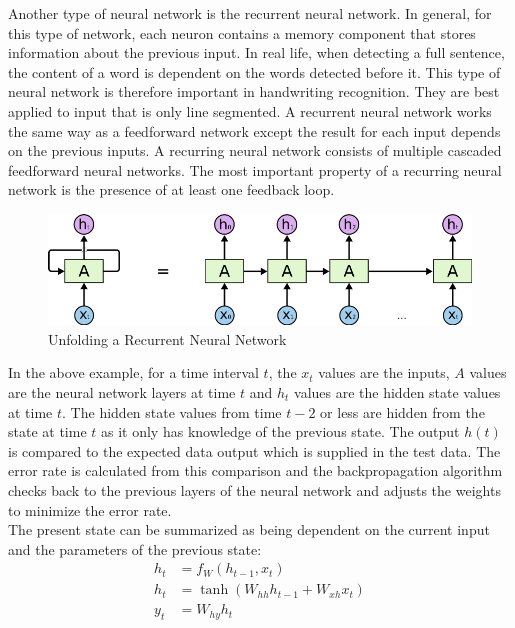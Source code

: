 Another type of neural network is the recurrent neural network. In general, for this type of network, each neuron contains a memory component that stores information about the previous input. In real life, when detecting a full sentence, the content of a word is dependent on the words detected before it. This type of neural network is therefore important in handwriting recognition. They are best applied to input that is only line segmented. A recurrent neural network works the same way as a feedforward network except the result for each input depends on the previous inputs. A recurring neural network consists of  multiple cascaded feedforward neural networks. The most important property of a recurring neural network is the presence of at least one feedback loop.

\begin{figure}[h]
	\centering
	\includegraphics[scale=0.4]{12}
	\caption{Unfolding a Recurrent Neural Network}
\end{figure}

In the above example, for a time interval $t$, the $x_t$ values are the inputs, $A$ values are the neural network layers at time $t$ and $h_t$ values are the hidden state values at time $t$. The hidden state values from time $t-2$ or less are hidden from the state at time $t$ as it only has knowledge of the previous state. The output $h(t)$ is compared to the expected data output which is supplied in the test data. The error rate is calculated from this comparison and the backpropagation algorithm checks back to the previous layers of the neural network and adjusts the weights to minimize the error rate.\\
The present state can be summarized as being dependent on the current input and the parameters of the previous state:
\begin{align}
h _ { t } &= f _ { W } \left( h _ { t - 1 } , x _ { t } \right) \nonumber \\
h _ { t } &= \tanh \left( W _ { h h } h _ { t - 1 } + W _ { x h } x _ { t } \right)\nonumber\\
y _ { t } &= W _ { h y } h _ { t }
\end{align}

